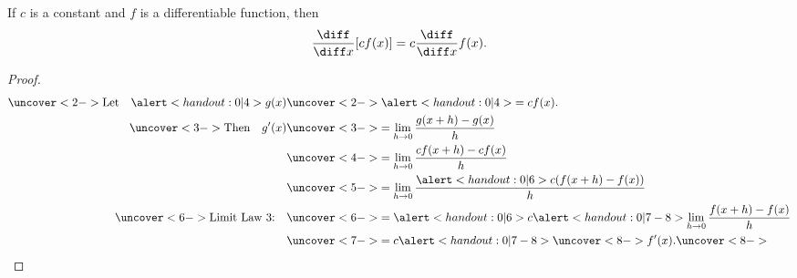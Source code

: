 \begin{frame}
\begin{theorem}
If $c$ is a constant and $f$ is a differentiable function, then
\abovedisplayskip=0pt
\belowdisplayskip=0pt
\[
\frac{\diff}{\diff x} [cf(x)] = c\frac{\diff}{\diff x}f(x).
\]
\end{theorem}
\begin{proof}
\abovedisplayskip=0pt
\belowdisplayskip=-15pt
\abovedisplayshortskip=0pt
\belowdisplayshortskip=0pt
\begin{align*}
\uncover<2->{%
\text{Let}\quad \alert<handout:0| 4>{g(x)} %
}%
 & \uncover<2->{%
 \alert<handout:0| 4>{= cf(x)}.  %
}\\%
\uncover<3->{%
\text{Then}\quad g'(x)%
}%
 & \uncover<3->{%
 = \lim_{h\rightarrow 0}\frac{g(x+h)-g(x)}{h}%
}\\%
 & \uncover<4->{%
 = \lim_{h\rightarrow 0}\frac{cf(x+h)-cf(x)}{h}%
}\\%
 & \uncover<5->{%
 = \lim_{h\rightarrow 0}\frac{\alert<handout:0| 6>{c}(f(x+h)-f(x))}{h}%
}\\%
\uncover<6->{%
\text{Limit Law 3:}\quad %
}%
 & \uncover<6->{%
 = \alert<handout:0| 6>{c}\alert<handout:0| 7-8>{\lim_{h\rightarrow 0}\frac{f(x+h)-f(x)}{h}}%
}\\%
 & \uncover<7->{%
 = c\alert<handout:0| 7-8>{\uncover<8->{f'(x).}}%
}%
\uncover<8->{\qedhere}
\end{align*}
\end{proof}
\end{frame}
